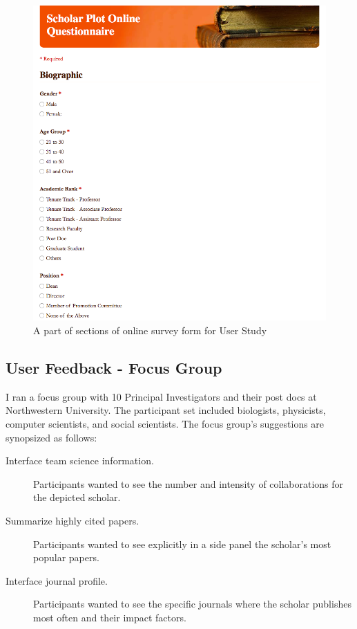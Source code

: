  \begin{figure}
  \centering
  \includegraphics[width=\columnwidth]{figures/fig_survey_form}
  \caption{A part of sections of online survey form for User Study}
  \label{fig:SurveyForm} 
\end{figure}

\subsection{User Feedback - Focus Group}
I ran a focus group with 10  Principal Investigators and their post docs at Northwestern University. The participant set included biologists, physicists, computer scientists, and social scientists.  The focus group's suggestions are synopsized as follows:
\begin{description}
\item [Interface team science information.] Participants wanted to see the number and intensity of collaborations for the depicted scholar.
\item [Summarize highly cited papers.] Participants wanted to see explicitly in a side panel the scholar's most popular papers.
\item [Interface journal profile.] Participants wanted to see the specific journals where the scholar publishes most often and their impact factors.
\end{description}


